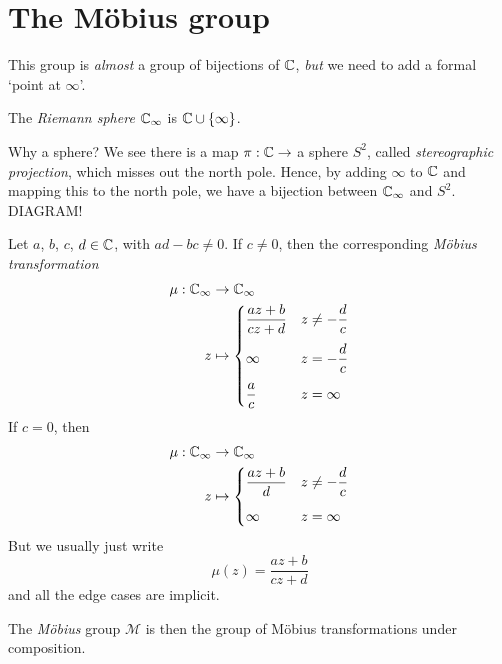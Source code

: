 \documentclass{../template/note}
\begin{document}
    
    
    


    \section{The M\"obius group}

    This group is \emph{almost} a group of bijections of \(\mathbb C\), \emph{but} we need to add a formal `point at \(\infty\)'.

    \begin{definition}
        The \emph{Riemann sphere} \(\mathbb C_\infty\) is \(\mathbb C \cup \{\infty\}\).
    \end{definition}
    
    \begin{remark*}
        Why a sphere? We see there is a map \(\pi: \mathbb C \to\) a sphere \(S^2\), called \emph{stereographic projection}, which misses out the north pole. Hence, by adding \(\infty\) to \(\mathbb C\) and mapping this to the north pole, we have a bijection between \(\mathbb C_\infty\) and \(S^2\).
        DIAGRAM!
    \end{remark*}
    
    \begin{definition}
        Let \(a\), \(b\), \(c\), \(d \in \mathbb C\), with \(ad - bc \neq 0\). If \(c \neq 0\), then the corresponding \emph{M\"obius transformation}
        \begin{align*}
            \mu: \mathbb C_\infty &\to \mathbb C_\infty \\
            z &\mapsto \begin{cases}
                \displaystyle \frac{az+b}{cz+d} & \displaystyle z \neq -\frac{d}{c} \\[10pt]
                \infty & \displaystyle z = -\frac{d}{c} \\[10pt]
                \displaystyle \frac{a}{c} & z = \infty
            \end{cases}
        \end{align*}
        If \(c = 0\), then
        \begin{align*}
            \mu: \mathbb C_\infty &\to \mathbb C_\infty \\
            z &\mapsto \begin{cases}
                \displaystyle \frac{az+b}{d} & \displaystyle z \neq -\frac{d}{c} \\[10pt]
                \infty & z = \infty
            \end{cases}
        \end{align*}
        But we usually just write
        \[
            \mu(z) = \frac{az+b}{cz+d}
        \]
        and all the edge cases are implicit.

        The \emph{M\"obius} group \(\mathcal M\) is then the group of M\"obius transformations under composition.
    \end{definition}
    
\end{document}

